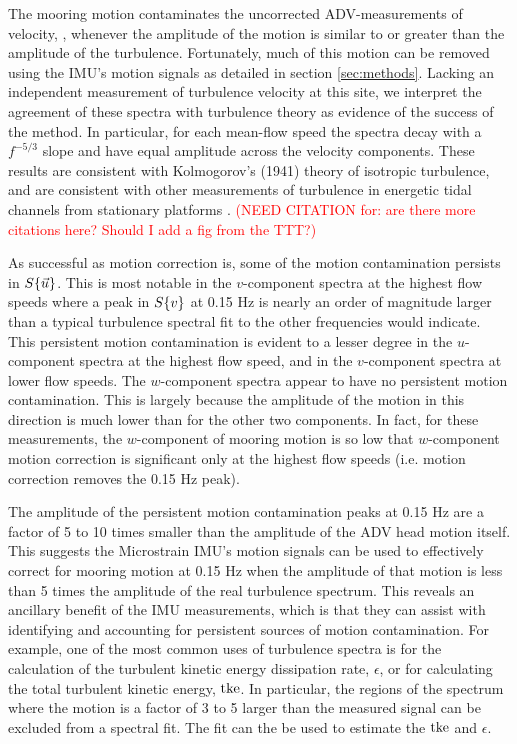 \documentclass[twocol]{ametsoc}
\newcommand{\citeneeded}[1]{\textcolor{red}{(NEED CITATION for: #1)}}
\begin{document}
The mooring motion contaminates the uncorrected ADV-measurements of velocity, \spec{\umeas}, whenever the amplitude of the motion is similar to or greater than the amplitude of the turbulence. Fortunately, much of this motion can be removed using the IMU's motion signals as detailed in section \ref{sec:methods}. Lacking an independent measurement of turbulence velocity at this site, we interpret the agreement of these spectra with turbulence theory as evidence of the success of the method. In particular, for each mean-flow speed the spectra decay with a $f^{-5/3}$ slope and have equal amplitude across the velocity components. These results are consistent with Kolmogorov's (1941) theory of isotropic turbulence, and are consistent with other measurements of turbulence in energetic tidal channels from stationary platforms \citep[]{Kolmogorov1941c,Thomson++2010}.  \citeneeded{are there more citations here? Should I add a fig from the TTT?}

As successful as motion correction is, some of the motion contamination persists in $S\{\vec{u}\}$. This is most notable in the $v$-component spectra at the highest flow speeds where a peak in $S\{v\}$ at 0.15 Hz is nearly an order of magnitude larger than a typical turbulence spectral fit to the other frequencies would indicate. This persistent motion contamination is evident to a lesser degree in the $u$-component spectra at the highest flow speed, and in the $v$-component spectra at lower flow speeds.  The $w$-component spectra appear to have no persistent motion contamination. This is largely because the amplitude of the motion in this direction is much lower than for the other two components. In fact, for these measurements, the $w$-component of mooring motion is so low that $w$-component motion correction is significant only at the highest flow speeds (i.e. motion correction removes the 0.15 Hz peak).

The amplitude of the persistent motion contamination peaks at 0.15 Hz are a factor of 5 to 10 times smaller than the amplitude of the ADV head motion itself. This suggests the Microstrain IMU's motion signals can be used to effectively correct for mooring motion at 0.15 Hz when the amplitude of that motion is less than 5 times the amplitude of the real turbulence spectrum.
This reveals an ancillary benefit of the IMU measurements, which is that they can assist with identifying and accounting for persistent sources of motion contamination. For example, one of the most common uses of turbulence spectra is for the calculation of the turbulent kinetic energy dissipation rate, $\epsilon$, or for calculating the total turbulent kinetic energy, $\mathrm{tke}$. In particular, the regions of the spectrum where the motion is a factor of 3 to 5 larger than the measured signal can be excluded from a spectral fit. The fit can the be used to estimate the $\mathrm{tke}$ and $\epsilon$. 
\end{document}
